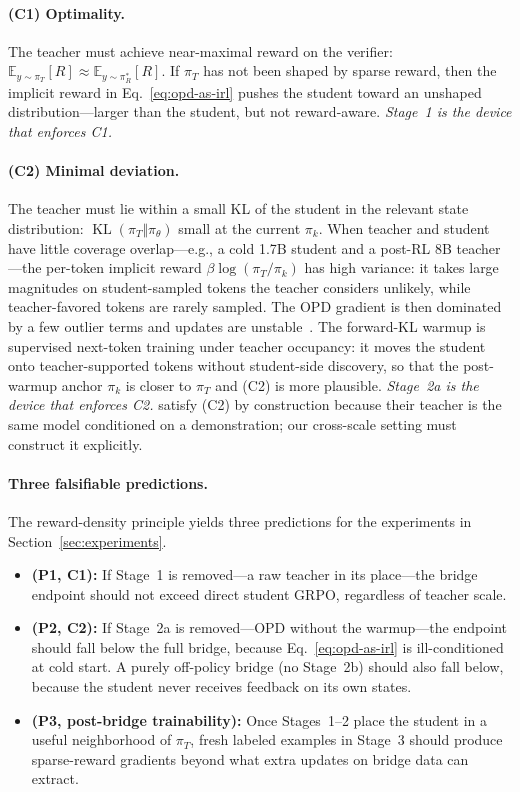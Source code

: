 \documentclass{article}
\begin{document}
\paragraph{(C1) Optimality.} The teacher must achieve near-maximal reward on the verifier: $\mathbb{E}_{y\sim\pi_T}[R]\approx\mathbb{E}_{y\sim\pi_R^*}[R]$. If $\pi_T$ has not been shaped by sparse reward, then the implicit reward in Eq.~\ref{eq:opd-as-irl} pushes the student toward an unshaped distribution---larger than the student, but not reward-aware. \emph{Stage~1 is the device that enforces C1.}

\paragraph{(C2) Minimal deviation.} The teacher must lie within a small KL of the student in the relevant state distribution: $\operatorname{KL}(\pi_T\Vert\pi_\theta)$ small at the current $\pi_k$. When teacher and student have little coverage overlap---e.g., a cold 1.7B student and a post-RL 8B teacher---the per-token implicit reward $\beta\log(\pi_T/\pi_k)$ has high variance: it takes large magnitudes on student-sampled tokens the teacher considers unlikely, while teacher-favored tokens are rarely sampled. The OPD gradient is then dominated by a few outlier terms and updates are unstable~\citep{li2026rethinkopd,hou2026uniopd}. The forward-KL warmup is supervised next-token training under teacher occupancy: it moves the student onto teacher-supported tokens without student-side discovery, so that the post-warmup anchor $\pi_k$ is closer to $\pi_T$ and (C2) is more plausible. \emph{Stage~2a is the device that enforces C2.} \citet{shenfeld2026selfdistillation} satisfy (C2) by construction because their teacher is the same model conditioned on a demonstration; our cross-scale setting must construct it explicitly.

\paragraph{Three falsifiable predictions.} The reward-density principle yields three predictions for the experiments in Section~\ref{sec:experiments}.
\begin{itemize}\setlength\itemsep{1pt}
\item \textbf{(P1, C1):} If Stage~1 is removed---a raw teacher in its place---the bridge endpoint should not exceed direct student GRPO, regardless of teacher scale.
\item \textbf{(P2, C2):} If Stage~2a is removed---OPD without the warmup---the endpoint should fall below the full bridge, because Eq.~\ref{eq:opd-as-irl} is ill-conditioned at cold start. A purely off-policy bridge (no Stage~2b) should also fall below, because the student never receives feedback on its own states.
\item \textbf{(P3, post-bridge trainability):} Once Stages~1--2 place the student in a useful neighborhood of $\pi_T$, fresh labeled examples in Stage~3 should produce sparse-reward gradients beyond what extra updates on bridge data can extract.
\end{itemize}
\end{document}
